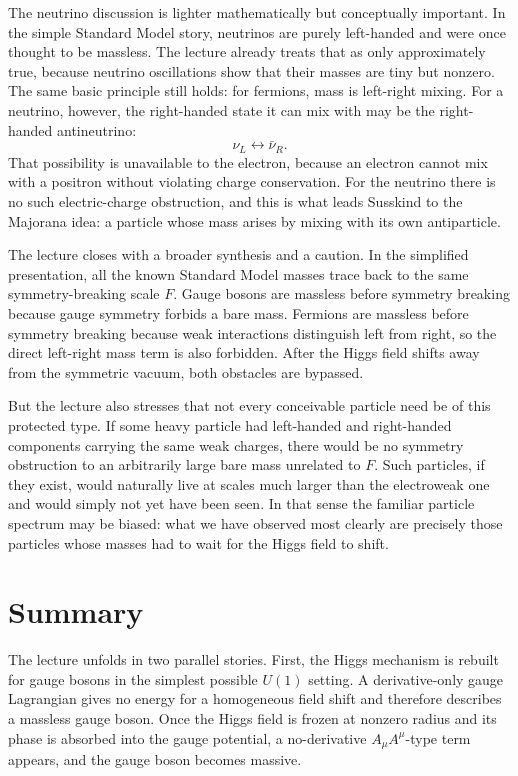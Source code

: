 The neutrino discussion is lighter mathematically but conceptually important. In the simple Standard Model story, neutrinos are purely left-handed and were once thought to be massless. The lecture already treats that as only approximately true, because neutrino oscillations show that their masses are tiny but nonzero. The same basic principle still holds: for fermions, mass is left-right mixing. For a neutrino, however, the right-handed state it can mix with may be the right-handed antineutrino:
\begin{equation}
\nu_L \longleftrightarrow \bar{\nu}_R.
\end{equation}
That possibility is unavailable to the electron, because an electron cannot mix with a positron without violating charge conservation. For the neutrino there is no such electric-charge obstruction, and this is what leads Susskind to the Majorana idea: a particle whose mass arises by mixing with its own antiparticle.

The lecture closes with a broader synthesis and a caution. In the simplified presentation, all the known Standard Model masses trace back to the same symmetry-breaking scale \(F\). Gauge bosons are massless before symmetry breaking because gauge symmetry forbids a bare mass. Fermions are massless before symmetry breaking because weak interactions distinguish left from right, so the direct left-right mass term is also forbidden. After the Higgs field shifts away from the symmetric vacuum, both obstacles are bypassed.

But the lecture also stresses that not every conceivable particle need be of this protected type. If some heavy particle had left-handed and right-handed components carrying the same weak charges, there would be no symmetry obstruction to an arbitrarily large bare mass unrelated to \(F\). Such particles, if they exist, would naturally live at scales much larger than the electroweak one and would simply not yet have been seen. In that sense the familiar particle spectrum may be biased: what we have observed most clearly are precisely those particles whose masses had to wait for the Higgs field to shift.

\section{Summary}

The lecture unfolds in two parallel stories. First, the Higgs mechanism is rebuilt for gauge bosons in the simplest possible \(U(1)\) setting. A derivative-only gauge Lagrangian gives no energy for a homogeneous field shift and therefore describes a massless gauge boson. Once the Higgs field is frozen at nonzero radius and its phase is absorbed into the gauge potential, a no-derivative \(A_\mu A^\mu\)-type term appears, and the gauge boson becomes massive.

